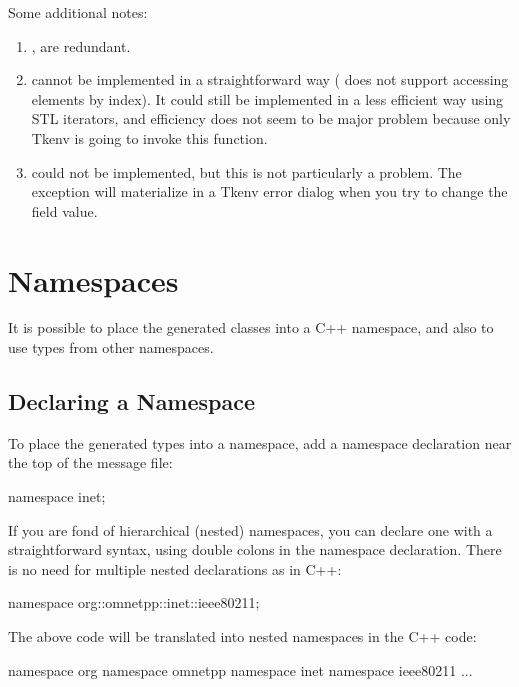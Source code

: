 Some additional notes:

\begin{enumerate}
  \item{,  are redundant.}
  \item{ cannot be implemented in a straightforward way
     ( does not support accessing elements by index).
     It could still be implemented in a less efficient way using STL iterators,
     and efficiency does not seem to be major problem because only Tkenv
     is going to invoke this function.}
  \item{ could not be implemented, but this
     is not particularly a problem. The exception will materialize in a
     Tkenv error dialog when you try to change the field value.}
\end{enumerate}



\section{Namespaces}
\label{sec:ch-msg-defs:namespaces}

It is possible to place the generated classes into a C++ namespace,
and also to use types from other namespaces.

\subsection{Declaring a Namespace}
\label{sec:ch-msg-defs:declaring-a-namespace}

To place the generated types into a namespace, add a namespace declaration
near the top of the message file:

\begin{msg}
namespace inet;
\end{msg}

If you are fond of hierarchical (nested) namespaces, you can declare one
with a straightforward syntax, using double colons in the namespace
declaration. There is no need for multiple nested 
declarations as in C++:

\begin{msg}
namespace org::omnetpp::inet::ieee80211;
\end{msg}

The above code will be translated into nested namespaces in the C++ code:

\begin{cpp}
namespace org { namespace omnetpp { namespace inet { namespace ieee80211 {
...
}}}}
\end{cpp}

